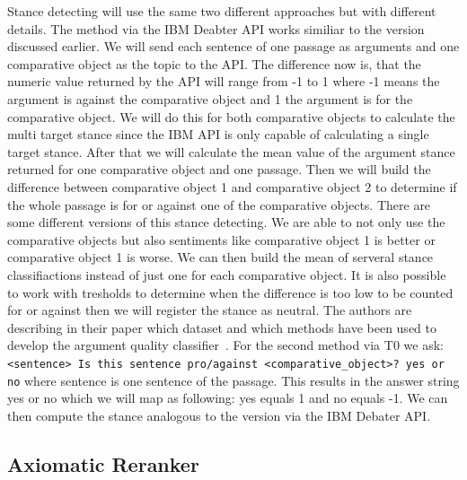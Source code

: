         Stance detecting will use the same two different approaches but with different details. The method via the IBM Deabter API works similiar to the version discussed earlier. We will send each sentence of one passage as arguments and one comparative object as the topic to the API. The difference now is, that the  numeric value returned by the API will range from -1 to 1 where -1 means the argument  is against the comparative object and 1 the argument is for the comparative object. We will do this for both comparative objects to calculate the multi target stance since the IBM API is only capable of calculating a single target stance. After that we will calculate the mean value of the argument stance returned for one comparative object and one passage. Then we will build the difference between comparative object 1 and comparative object 2 to determine if the whole passage is for or against one of the comparative objects. There are some different versions of this stance detecting. We are able to not only use the comparative objects but also sentiments like comparative object 1 is better or comparative object 1 is worse. We can then build the mean of serveral stance classifiactions instead of just one for each comparative object. It is also possible to work with tresholds to determine when the difference is too low to be counted for or against then we will register the stance as neutral.  The authors \citeauthor{BarHaimBDSS2017} are describing in their paper which dataset and which methods have been used to develop the argument quality classifier~\cite{BarHaimBDSS2017}. For the second method via T0 we ask: \texttt{<sentence> Is this sentence pro/against <comparative\_object>? yes or no} where sentence is one sentence of the passage. This results in the answer string yes or no which we will map as following: yes equals 1 and no equals -1. We can then compute the stance analogous to the version via the IBM Debater API.
    \subsection{Axiomatic Reranker}